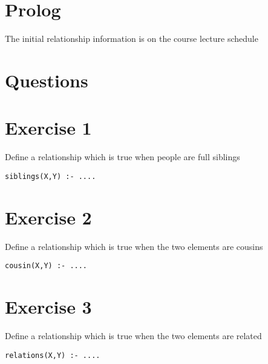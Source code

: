 \documentclass{article}
\begin{document}
\section{Prolog}

The initial relationship information is on the course lecture schedule

\section{Questions}

\section{Exercise 1}

Define a relationship which is true when people are full siblings
\begin{verbatim}
siblings(X,Y) :- ....
\end{verbatim}

\section{Exercise 2}

Define a relationship which is true when the two elements are cousins
\begin{verbatim}
cousin(X,Y) :- ....
\end{verbatim}

\section{Exercise 3}

Define a relationship which is true when the two elements are related
\begin{verbatim}
relations(X,Y) :- ....
\end{verbatim}
\end{document}
